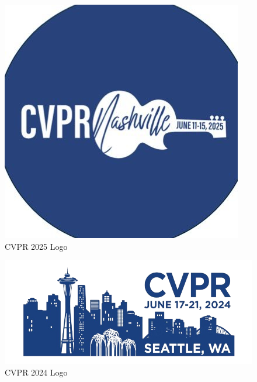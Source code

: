 \documentclass[sigconf, 10pt]{acmart}
\begin{document}
\begin{figure}[h]
	\centering
	\includegraphics[width=\columnwidth]{./appendix/cvpr25-logo.jpg}
	\caption{CVPR 2025 Logo}
	\label{fig:cvpr25logo}
\end{figure}

\begin{figure}[h]
	\centering
	\includegraphics[width=\columnwidth]{./appendix/cvpr24-logo.png}
	\caption{CVPR 2024 Logo}
	\label{fig:cvpr24logo}
\end{figure}


\vspace{-3pt}


\end{document}
